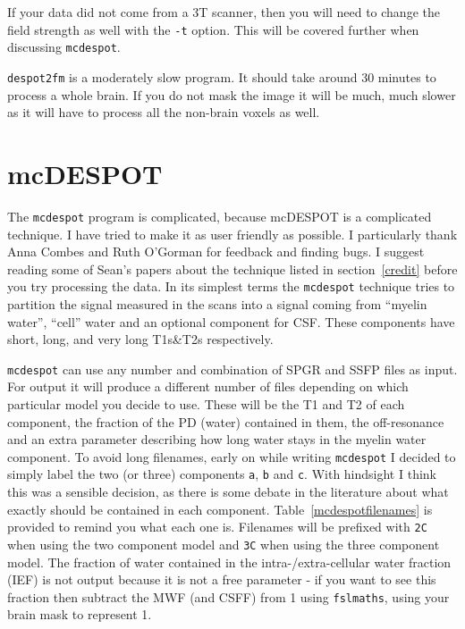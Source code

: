\documentclass{report}
\begin{document}
If your data did not come from a 3T scanner, then you will need to change the field strength as well with the \texttt{-t} option. This will be covered further when discussing \texttt{mcdespot}.

\texttt{despot2fm} is a moderately slow program. It should take around 30 minutes to process a whole brain. If you do not mask the image it will be much, much slower as it will have to process all the non-brain voxels as well.

\section{mcDESPOT}

The \texttt{mcdespot} program is complicated, because mcDESPOT is a complicated technique. I have tried to make it as user friendly as possible. I particularly thank Anna Combes and Ruth O'Gorman for feedback and finding bugs. I suggest reading some of Sean's papers about the technique listed in section~\ref{credit} before you try processing the data. In its simplest terms the \texttt{mcdespot} technique tries to partition the signal measured in the scans into a signal coming from ``myelin water'', ``cell'' water and an optional component for CSF. These components have short, long, and very long T1s\&T2s respectively.

\texttt{mcdespot} can use any number and combination of SPGR and SSFP files as input. For output it will produce a different number of files depending on which particular model you decide to use. These will be the T1 and T2 of each component, the fraction of the PD (water) contained in them, the off-resonance and an extra parameter describing how long water stays in the myelin water component. To avoid long filenames, early on while writing \texttt{mcdespot} I decided to simply label the two (or three) components \texttt{a}, \texttt{b} and \texttt{c}. With hindsight I think this was a sensible decision, as there is some debate in the literature about what exactly should be contained in each component. Table~\ref{mcdespotfilenames} is provided to remind you what each one is. Filenames will be prefixed with \texttt{2C} when using the two component model and \texttt{3C} when using the three component model. The fraction of water contained in the intra-/extra-cellular water fraction (IEF) is not output because it is not a free parameter - if you want to see this fraction then subtract the MWF (and CSFF) from 1 using \texttt{fslmaths}, using your brain mask to represent 1.
\end{document}
